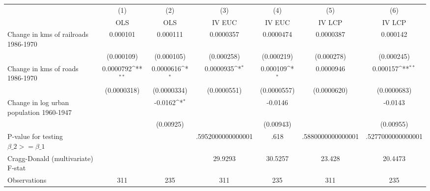 {
\def\sym#1{\ifmmode^{#1}\else\(^{#1}\)\fi}
\begin{tabular}{l*{6}{c}}
\hline\hline
                &\multicolumn{1}{c}{(1)}&\multicolumn{1}{c}{(2)}&\multicolumn{1}{c}{(3)}&\multicolumn{1}{c}{(4)}&\multicolumn{1}{c}{(5)}&\multicolumn{1}{c}{(6)}\\
                &\multicolumn{1}{c}{OLS}&\multicolumn{1}{c}{OLS}&\multicolumn{1}{c}{IV EUC}&\multicolumn{1}{c}{IV EUC}&\multicolumn{1}{c}{IV LCP}&\multicolumn{1}{c}{IV LCP}\\
\hline
Change in kms of railroads 1986-1970& 0.000101         & 0.000111         &0.0000357         &0.0000474         &0.0000387         & 0.000142         \\
                &(0.000109)         &(0.000105)         &(0.000258)         &(0.000219)         &(0.000278)         &(0.000245)         \\
[1em]
Change in kms of roads 1986-1970&0.0000792\sym{**} &0.0000616\sym{*}  &0.0000935\sym{*}  & 0.000109\sym{*}  &0.0000946         & 0.000157\sym{**} \\
                &(0.0000318)         &(0.0000334)         &(0.0000551)         &(0.0000557)         &(0.0000620)         &(0.0000683)         \\
[1em]
Change in log urban population 1960-1947&                  &  -0.0162\sym{*}  &                  &  -0.0146         &                  &  -0.0143         \\
                &                  &(0.00925)         &                  &(0.00943)         &                  &(0.00955)         \\
\hline
P-value for testing $\beta\_{2} >= \beta\_{1}$&                  &                  &.5952000000000001         &     .618         &.5880000000000001         &.5277000000000001         \\
Cragg-Donald (multivariate) F-stat&                  &                  &  29.9293         &  30.5257         &   23.428         &  20.4473         \\
Observations    &      311         &      235         &      311         &      235         &      311         &      235         \\
\hline\hline
\end{tabular}
}
